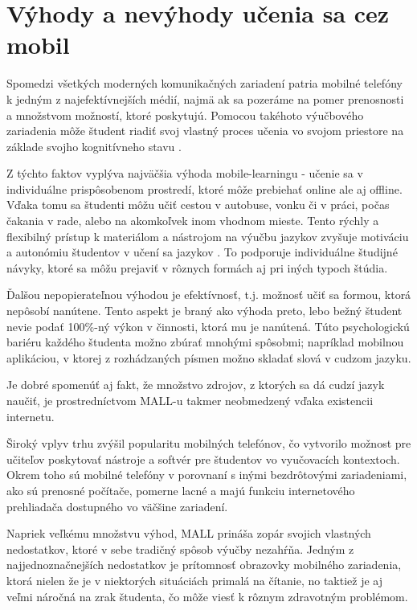 \documentclass[10pt,oneside,slovak,a4paper]{article}
\begin{document}
\section{Výhody a nevýhody učenia sa cez mobil} \label{vyhodyanevyhody}

Spomedzi všetkých moderných komunikačných zariadení patria mobilné telefóny k jedným z najefektívnejších médií, najmä ak sa pozeráme na pomer prenosnosti a množstvom možností, ktoré poskytujú. Pomocou takéhoto výučbového zariadenia môže študent riadiť svoj vlastný proces učenia vo svojom priestore na základe svojho kognitívneho stavu \cite{Miangah2012}. 

Z týchto faktov vyplýva najväčšia výhoda mobile-learningu - učenie sa v individuálne prispôsobenom prostredí, ktoré môže prebiehať online ale aj offline. Vďaka tomu sa študenti môžu učiť cestou v autobuse, vonku či v práci, počas čakania v rade, alebo na akomkoľvek inom vhodnom mieste. Tento rýchly a flexibilný prístup k materiálom a nástrojom na výučbu jazykov zvyšuje motiváciu a autonómiu študentov v učení sa jazykov \cite{Kim2012}. To podporuje individuálne študijné návyky, ktoré sa môžu prejaviť v rôznych formách aj pri iných typoch štúdia.

Ďalšou nepopierateľnou výhodou je efektívnosť, t.j. možnosť učiť sa formou, ktorá nepôsobí nanútene. Tento aspekt je braný ako výhoda preto, lebo bežný študent nevie podať 100\%-ný výkon v činnosti, ktorá mu je nanútená. Túto psychologickú bariéru každého študenta možno zbúrať mnohými spôsobmi; napríklad mobilnou aplikáciou, v ktorej z rozhádzaných písmen možno skladať slová v cudzom jazyku.

Je dobré spomenúť aj fakt, že množstvo zdrojov, z ktorých sa dá cudzí jazyk naučiť, je prostredníctvom MALL-u takmer neobmedzený vďaka existencii internetu.

Široký vplyv trhu zvýšil popularitu mobilných telefónov, čo vytvorilo možnost pre učiteľov poskytovať nástroje a softvér pre študentov vo vyučovacích kontextoch\cite{Miangah2012}. Okrem toho sú mobilné telefóny v porovnaní s inými bezdrôtovými zariadeniami, ako sú prenosné počítače, pomerne lacné a majú funkciu internetového prehliadača dostupného vo väčšine zariadení\cite{Miangah2012}.

Napriek veľkému množstvu výhod, MALL prináša zopár svojich vlastných nedostatkov, ktoré v sebe tradičný spôsob výučby nezahŕňa. Jedným z najjednoznačnejších nedostatkov je prítomnosť obrazovky mobilného zariadenia, ktorá nielen že je v niektorých situáciách primalá na čítanie, no taktiež je aj veľmi náročná na zrak študenta, čo môže viesť k rôznym zdravotným problémom.
\end{document}
